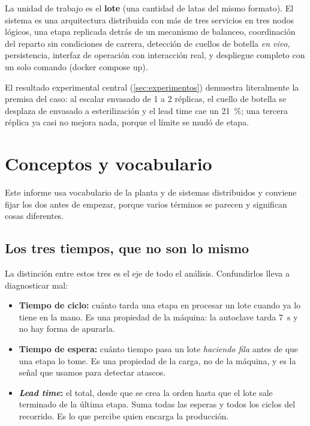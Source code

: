 \documentclass[12pt,a4paper]{article}
\begin{document}
La unidad de trabajo es el \textbf{lote} (una cantidad de latas del mismo
formato). El sistema es una arquitectura
distribuida con más de tres servicios en tres nodos lógicos, una etapa
replicada detrás de un mecanismo de balanceo, coordinación del reparto sin
condiciones de carrera, detección de cuellos de botella \emph{en vivo},
persistencia, interfaz de operación con interacción real, y despliegue completo
con un solo comando (docker compose up).

El resultado experimental central (\ref{sec:experimentos}) demuestra
literalmente la premisa del caso: al escalar envasado de 1 a 2 réplicas, el
cuello de botella se desplaza de envasado a esterilización y el lead
time cae un 21~\%; una tercera réplica ya casi no mejora nada, porque el límite
se mudó de etapa.

\section{Conceptos y vocabulario}
\label{sec:vocabulario}

Este informe usa vocabulario de la planta y de sistemas distribuidos y conviene fijar los dos antes de empezar, porque
varios términos se parecen y significan cosas diferentes.

\subsection{Los tres tiempos, que no son lo mismo}

La distinción entre estos tres es el eje de todo el análisis. Confundirlos lleva
a diagnosticar mal:

\begin{itemize}[leftmargin=*, itemsep=2pt]
  \item \textbf{Tiempo de ciclo:} cuánto tarda una etapa en procesar un lote
        cuando ya lo tiene en la mano. Es una propiedad de la máquina: la
        autoclave tarda 7~s y no hay forma de apurarla.
  \item \textbf{Tiempo de espera:} cuánto tiempo pasa un lote \emph{haciendo
        fila} antes de que una etapa lo tome. Es una propiedad de la carga, no
        de la máquina, y es la señal que usamos para detectar atascos.
  \item \textbf{\emph{Lead time}:} el total, desde que se
        crea la orden hasta que el lote sale terminado de la última etapa.
        Suma todas las esperas y todos los ciclos del recorrido. Es lo que
        percibe quien encarga la producción.
\end{itemize}
\end{document}
